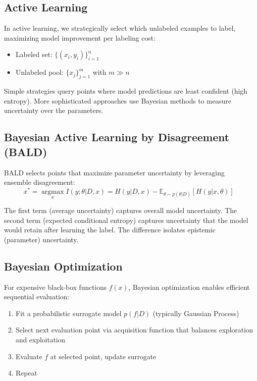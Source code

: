 \documentclass[12pt,a4paper]{article}
\theoremstyle{definition}
\begin{document}
\subsection{Active Learning}

In active learning, we strategically select which unlabeled examples to label, maximizing model improvement per labeling cost:
\begin{itemize}
    \item Labeled set: $\{(x_i, y_i)\}_{i=1}^n$
    \item Unlabeled pool: $\{x_j\}_{j=1}^m$ with $m \gg n$
\end{itemize}

Simple strategies query points where model predictions are least confident (high entropy). More sophisticated approaches use Bayesian methods to measure uncertainty over the parameters.

\subsection{Bayesian Active Learning by Disagreement (BALD)}

BALD selects points that maximize parameter uncertainty by leveraging ensemble disagreement:
\[
x^* = \operatorname*{argmax}_x I(y; \theta | D, x) = H(y|D,x) - \mathbb{E}_{\theta \sim p(\theta|D)}[H(y|x,\theta)]
\]

The first term (average uncertainty) captures overall model uncertainty. The second term (expected conditional entropy) captures uncertainty that the model would retain after learning the label. The difference isolates epistemic (parameter) uncertainty.

\subsection{Bayesian Optimization}

For expensive black-box functions $f(x)$, Bayesian optimization enables efficient sequential evaluation:
\begin{enumerate}
    \item Fit a probabilistic surrogate model $p(f|D)$ (typically Gaussian Process)
    \item Select next evaluation point via acquisition function that balances exploration and exploitation
    \item Evaluate $f$ at selected point, update surrogate
    \item Repeat
\end{enumerate}
\end{document}
